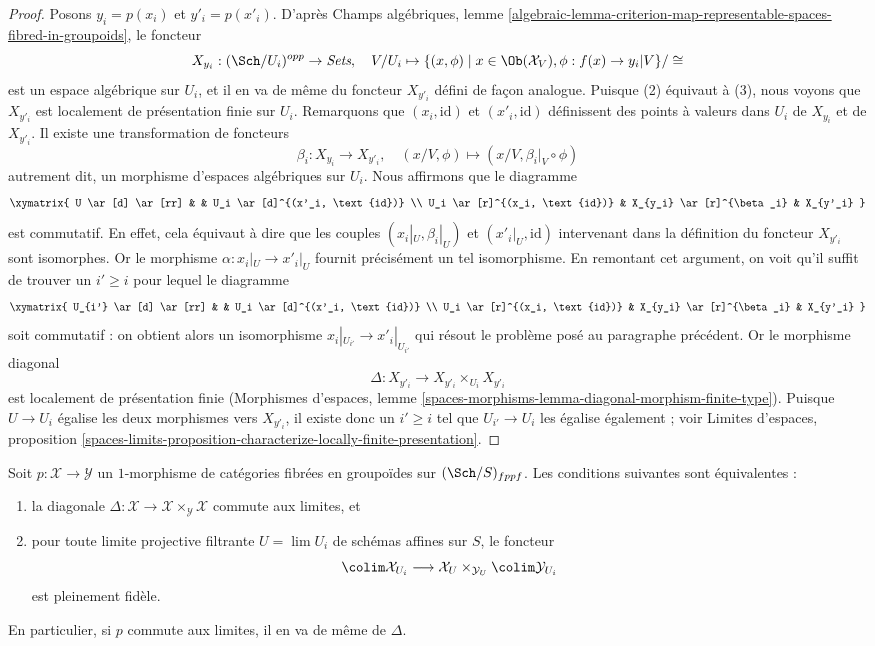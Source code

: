 \begin{proof}
\medskip\noindent
Posons $y_i = p(x_i)$ et $y'_i = p(x'_i)$. D'après Champs algébriques,
lemme
\ref{algebraic-lemma-criterion-map-representable-spaces-fibred-in-groupoids},
le foncteur
$$
X_{y_i} : (\Sch/U_i)^{opp} \to \textit{Sets},\quad
V/U_i \mapsto
\{(x, \phi) \mid x \in \Ob(\mathcal{X}_V), \phi : f(x) \to y_i|V\}/\cong
$$
est un espace algébrique sur $U_i$, et il en va de même du foncteur
$X_{y'_i}$ défini de façon analogue. Puisque (2) équivaut à (3), nous voyons
que $X_{y'_i}$ est localement de présentation finie sur $U_i$. Remarquons que
$(x_i, \text{id})$ et $(x'_i, \text{id})$ définissent des points à valeurs
dans $U_i$ de $X_{y_i}$ et de $X_{y'_i}$. Il existe une transformation de
foncteurs
$$
\beta_i : X_{y_i} \to X_{y'_i},\quad
(x/V, \phi) \mapsto (x/V, \beta_i|_V \circ \phi)
$$
autrement dit, un morphisme d'espaces algébriques sur $U_i$. Nous affirmons
que le diagramme
$$
\xymatrix{
U \ar[d] \ar[rr] & & U_i \ar[d]^{(x'_i, \text{id})} \\
U_i \ar[r]^{(x_i, \text{id})} & X_{y_i} \ar[r]^{\beta_i} & X_{y'_i}
}
$$
est commutatif. En effet, cela équivaut à dire que les couples
$(x_i|_U, \beta_i|_U)$ et $(x'_i|_U, \text{id})$ intervenant dans la
définition du foncteur $X_{y'_i}$ sont isomorphes. Or le morphisme
$\alpha : x_i|_U \to x'_i|_U$ fournit précisément un tel isomorphisme. En
remontant cet argument, on voit qu'il suffit de trouver un $i' \geq i$ pour
lequel le diagramme
$$
\xymatrix{
U_{i'} \ar[d] \ar[rr] & & U_i \ar[d]^{(x'_i, \text{id})} \\
U_i \ar[r]^{(x_i, \text{id})} & X_{y_i} \ar[r]^{\beta_i} & X_{y'_i}
}
$$
soit commutatif : on obtient alors un isomorphisme
$x_i|_{U_{i'}} \to x'_i|_{U_{i'}}$ qui résout le problème posé au paragraphe
précédent. Or le morphisme diagonal
$$
\Delta : X_{y'_i} \to X_{y'_i} \times_{U_i} X_{y'_i}
$$
est localement de présentation finie (Morphismes d'espaces, lemme
\ref{spaces-morphisms-lemma-diagonal-morphism-finite-type}). Puisque
$U \to U_i$ égalise les deux morphismes vers $X_{y'_i}$, il existe donc un
$i' \geq i$ tel que $U_{i'} \to U_i$ les égalise également ; voir Limites
d'espaces, proposition
\ref{spaces-limits-proposition-characterize-locally-finite-presentation}.
\end{proof}

\begin{lemma}
\label{lemma-limit-preserving-diagonal}
Soit $p : \mathcal{X} \to \mathcal{Y}$ un $1$-morphisme de catégories
fibrées en groupoïdes sur $(\Sch/S)_{fppf}$. Les conditions suivantes sont
équivalentes :
\begin{enumerate}
\item la diagonale
$\Delta : \mathcal{X} \to \mathcal{X} \times_\mathcal{Y} \mathcal{X}$
commute aux limites, et
\item pour toute limite projective filtrante $U = \lim U_i$ de schémas
affines sur $S$, le foncteur
$$
\colim \mathcal{X}_{U_i} \longrightarrow
\mathcal{X}_U \times_{\mathcal{Y}_U} \colim \mathcal{Y}_{U_i}
$$
est pleinement fidèle.
\end{enumerate}
En particulier, si $p$ commute aux limites, il en va de même de $\Delta$.
\end{lemma}

